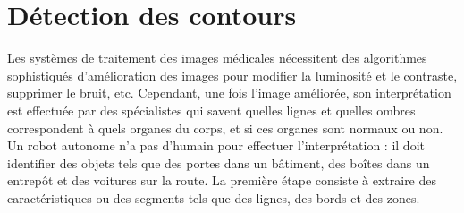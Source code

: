 \section{Détection des contours}\label{s.edge-detection}

Les systèmes de traitement des images médicales nécessitent des algorithmes sophistiqués d'amélioration des images pour modifier la luminosité et le contraste, supprimer le bruit, etc. Cependant, une fois l'image améliorée, son interprétation est effectuée par des spécialistes qui savent quelles lignes et quelles ombres correspondent à quels organes du corps, et si ces organes sont normaux ou non. Un robot autonome n'a pas d'humain pour effectuer l'interprétation : il doit identifier des objets tels que des portes dans un bâtiment, des boîtes dans un entrepôt et des voitures sur la route. La première étape consiste à extraire des caractéristiques ou des segments tels que des lignes, des bords et des zones.

